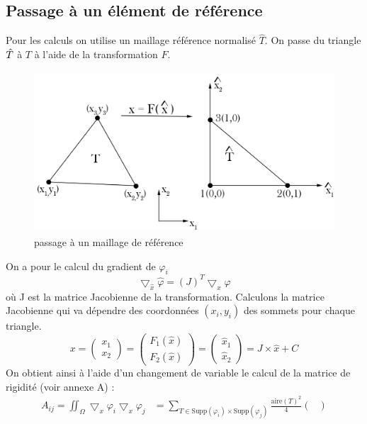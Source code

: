 \documentclass[a4paper,12pt,titlepage]{report}
\begin{document}
\begin{onehalfspace}
\subsection{Passage à un élément de référence}
Pour les calculs on utilise un maillage référence  normalisé $\hat{T}$. On passe du triangle $\Hat{T}$ à $T$ à l'aide de la transformation $F$. 
\begin{figure}[h!]
\begin{center}
\includegraphics[height = 6cm, keepaspectratio]{graphes/transformation_de_maillage.png} 
\caption{\label{figure 4 } passage à un maillage de référence}
\end{center}
\end{figure}
On a pour le calcul du gradient de $\varphi_{i}$
\[ \bigtriangledown_{\hat{x}} \hat{\varphi} = (J)^{T} \bigtriangledown_{x} \varphi  \]
où J est la matrice Jacobienne de la transformation.
Calculons la matrice Jacobienne qui va dépendre des coordonnées $(x_{i},y_{i})$ des sommets pour chaque triangle.
\[
x = \begin{pmatrix}
   x_{1} \\
   x_{2} 
\end{pmatrix}
= \begin{pmatrix}
   F_{1}(\hat{x}) \\
   F_{2}(\hat{x}) 
\end{pmatrix}
= \begin{pmatrix}
   \hat{x}_{1} \\
   \hat{x}_{2} 
\end{pmatrix}
= J \times \hat{x} + C
\]
On obtient ainsi à l'aide d'un changement de variable le calcul de la matrice de rigidité (voir annexe A) : 
\[
\boxed{
\begin{aligned}
A_{ij} = 
	\iint_{\Omega}\bigtriangledown_{x}{\varphi_{i}} \bigtriangledown_{x}{\varphi_{j}} &= 
	\sum_{T \in \text{Supp}(\varphi_{i})\times \text{Supp}(\varphi_{j})}	
	\frac{\text{aire}(T)^{2}}{4}
	\begin{pmatrix}

\end{pmatrix}
\end{aligned}}\]
\end{onehalfspace}
\end{document}
